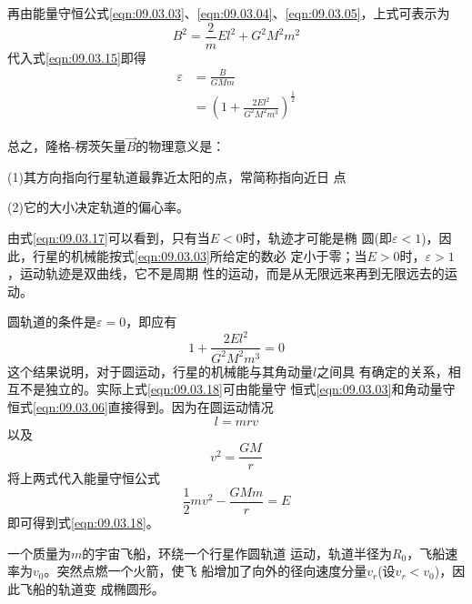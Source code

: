 \documentclass[../outline-of-mechanics.tex]{subfiles}
\begin{document}
\clearpage\noindent 再由能量守恒公式\eqref{eqn:09.03.03}、\eqref{eqn:09.03.04}、\eqref{eqn:09.03.05}，上式可表示为
\begin{equation}\label{eqn:09.03.16}
  B ^ { 2 } = \frac { 2 } { m } E l ^ { 2 } + G ^ { 2 } M ^ { 2 } m ^ { 2 }
\end{equation}
代入式\eqref{eqn:09.03.15}即得
\begin{equation}\label{eqn:09.03.17}
  \begin{split}
    \varepsilon &= \frac { B } { G M m } \\
    &= \left( 1 + \frac { 2 E l ^ { 2 } } { G ^ { 2 } M ^ { 2 } m ^ { 3 } } \right) ^ { \frac { 1 } { 2 } }
  \end{split}
\end{equation}

总之，隆格-楞茨矢量$ \vec{B} $的物理意义是：

(1)其方向指向行星轨道最靠近太阳的点，常简称指向近日
点

(2)它的大小决定轨道的偏心率。

由式\eqref{eqn:09.03.17}可以看到，只有当$ E<0 $时，轨迹才可能是椭
圆(即$ \varepsilon < 1 $)，因此，行星的机械能\lhbrak 按式\eqref{eqn:09.03.03}所给定的数\rhbrak 必
定小于零；当$ E > 0 $时，$ \varepsilon > 1 $，运动轨迹是双曲线，它不是周期
性的运动，而是从无限远来再到无限远去的运动。

圆轨道的条件是$ \varepsilon = 0 $，即应有
\begin{equation}\label{eqn:09.03.18}
  1 + \frac { 2 E l ^ { 2 } } { G ^ { 2 } M ^ { 2 } m ^ { 3 } } = 0
\end{equation}
这个结果说明，对于圆运动，行星的机械能与其角动量$ l $之间具
有确定的关系，相互不是独立的。实际上式\eqref{eqn:09.03.18}可由能量守
恒式\eqref{eqn:09.03.03}和角动量守恒式\eqref{eqn:09.03.06}直接得到。因为在圆运动情况
\begin{equation*}
  l = m r v
\end{equation*}
以及
\begin{equation*}
  v ^ { 2 } = \frac { G M } { r }
\end{equation*}
将上两式代入能量守恒公式
\begin{equation*}
  \frac { 1 } { 2 } m v ^ { 2 } - \frac { G M m } { r } = E
\end{equation*}
即可得到式\eqref{eqn:09.03.18}。

\example 一个质量为$ m $的宇宙飞船，环绕一个行星作圆轨道
运动，轨道半径为$ R _ 0 $，飞船速率为$ v _ 0 $。突然点燃一个火箭，使飞
船增加了向外的径向速度分量$ v _ r $(设$ v _ r < v _ 0$)，因此飞船的轨道变
成椭圆形。
\end{document}
